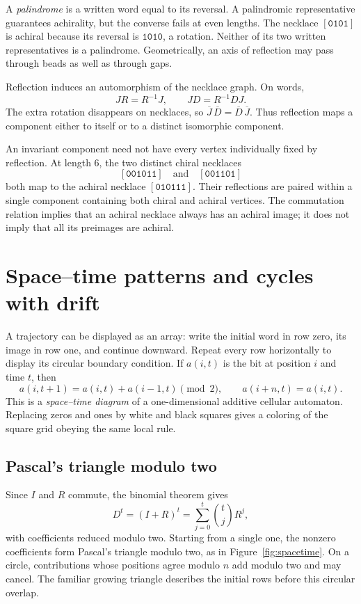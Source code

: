 \documentclass[11pt]{article}
\theoremstyle{definition}
\newcommand{\neck}[1]{[\mathtt{#1}]}
\newcommand{\word}[1]{\mathtt{#1}}
\numberwithin{equation}{section}
\begin{document}
A \emph{palindrome} is a written word equal to its reversal. A
palindromic representative guarantees achirality, but the converse
fails at even lengths. The necklace $\neck{0101}$ is achiral because
its reversal is $\word{1010}$, a rotation. Neither of its two written
representatives is a palindrome. Geometrically, an axis of reflection
may pass through beads as well as through gaps.

Reflection induces an automorphism of the necklace graph. On words,
\[
 JR=R^{-1}J,\qquad JD=R^{-1}DJ.
\]
The extra rotation disappears on necklaces, so
$\overline J\,\overline D=\overline D\,\overline J$. Thus reflection
maps a component either to itself or to a distinct isomorphic component.

An invariant component need not have every vertex individually fixed
by reflection. At length $6$, the two distinct chiral necklaces
\[
 \neck{001011}\quad\text{and}\quad\neck{001101}
\]
both map to the achiral necklace $\neck{010111}$. Their reflections
are paired within a single component containing both chiral and
achiral vertices. The commutation relation implies that an achiral
necklace always has an achiral image; it does not imply that all its
preimages are achiral.

\section{Space--time patterns and cycles with drift}\label{sec:patterns}

A trajectory can be displayed as an array: write the initial word in
row zero, its image in row one, and continue downward. Repeat every
row horizontally to display its circular boundary condition. If
$a(i,t)$ is the bit at position $i$ and time $t$, then
\begin{equation}\label{eq:spacetime}
 a(i,t+1)=a(i,t)+a(i-1,t)\pmod2,
 \qquad a(i+n,t)=a(i,t).
\end{equation}
This is a \emph{space--time diagram} of a one-dimensional additive
cellular automaton. Replacing zeros and ones by white and black squares
gives a coloring of the square grid obeying the same local rule.

\subsection{Pascal's triangle modulo two}

Since $I$ and $R$ commute, the binomial theorem gives
\begin{equation}\label{eq:pascal}
 D^t=(I+R)^t=\sum_{j=0}^{t}\binom tj R^j,
\end{equation}
with coefficients reduced modulo two. Starting from a single one,
the nonzero coefficients form Pascal's triangle modulo two, as in
Figure~\ref{fig:spacetime}. On a circle, contributions whose positions
agree modulo $n$ add modulo two and may cancel. The familiar growing
triangle describes the initial rows before this circular overlap.
\end{document}
